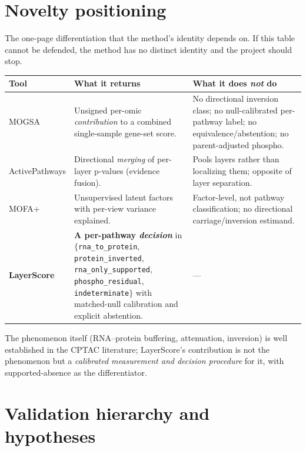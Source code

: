 \documentclass[11pt]{article}
\newcommand{\Ccar}{\texttt{rna\_to\_protein}}
\newcommand{\Cinv}{\texttt{protein\_inverted}}
\newcommand{\Crna}{\texttt{rna\_only\_supported}}
\newcommand{\Cpho}{\texttt{phospho\_residual}}
\newcommand{\Cind}{\texttt{indeterminate}}
\begin{document}
\section{Novelty positioning}\label{sec:novelty}
The one-page differentiation that the method's identity depends on. If this table cannot be defended, the
method has no distinct identity and the project should stop.

\begin{center}\small
\begin{tabularx}{\textwidth}{@{}p{2.4cm} L p{3.5cm}@{}}
\toprule
\textbf{Tool} & \textbf{What it returns} & \textbf{What it does \emph{not} do} \\
\midrule
MOGSA & Unsigned per-omic \emph{contribution} to a combined single-sample gene-set score. & No directional inversion class; no null-calibrated per-pathway label; no equivalence/abstention; no parent-adjusted phospho. \\
ActivePathways & Directional \emph{merging} of per-layer p-values (evidence fusion). & Pools layers rather than localizing them; opposite of layer separation. \\
MOFA+ & Unsupervised latent factors with per-view variance explained. & Factor-level, not pathway classification; no directional carriage/inversion estimand. \\
\midrule
\textbf{LayerScore} & \textbf{A per-pathway \emph{decision}} in $\{$\Ccar{}, \Cinv{}, \Crna{}, \Cpho{}, \Cind{}$\}$ with matched-null calibration and explicit abstention. & --- \\
\bottomrule
\end{tabularx}
\end{center}
\noindent The phenomenon itself (RNA--protein buffering, attenuation, inversion) is well established in the
CPTAC literature; LayerScore's contribution is not the phenomenon but a \emph{calibrated measurement and
decision procedure} for it, with supported-absence as the differentiator.

\section{Validation hierarchy and hypotheses}
\end{document}
